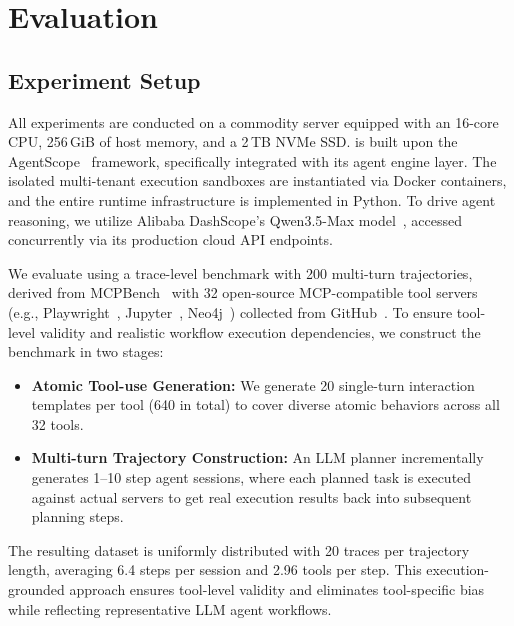 \vspace{-0.2em}
\section{Evaluation}
\label{evaluation}


\subsection{Experiment Setup}
\label{sec:exp:setup}
All experiments are conducted on a commodity server equipped with an 16-core CPU, 256\,GiB of host memory, and a 2\,TB NVMe SSD. \SystemName is built upon the AgentScope~\cite{gao2024agentscope} framework, specifically integrated with its agent engine layer. The isolated multi-tenant execution sandboxes are instantiated via Docker containers, and the entire runtime infrastructure is implemented in Python. To drive agent reasoning, we utilize Alibaba DashScope's Qwen3.5-Max model~\cite{dashscope2026}, accessed concurrently via its production cloud API endpoints.

We evaluate \SystemName using a trace-level benchmark with 200 multi-turn trajectories, derived from MCPBench~\cite{wang2025mcp} with 32 open-source MCP-compatible tool servers (e.g., Playwright~\cite{playwright}, Jupyter~\cite{jupyter}, Neo4j~\cite{neo4j}) collected from GitHub~\cite{githubmcp}. To ensure tool-level validity and realistic workflow execution dependencies, we construct the benchmark in two stages: 
\begin{itemize}[leftmargin=1.2em]
    \item \textbf{Atomic Tool-use Generation:} We generate 20 single-turn interaction templates per tool (640 in total) to cover diverse atomic behaviors across all 32 tools.
    \item \textbf{Multi-turn Trajectory Construction:} An LLM planner incrementally generates 1--10 step agent sessions, where each planned task is executed against actual servers to get real execution results back into subsequent planning steps.
\end{itemize}
The resulting dataset is uniformly distributed with 20 traces per trajectory length, averaging 6.4 steps per session and 2.96 tools per step. This execution-grounded approach ensures tool-level validity and eliminates tool-specific bias while reflecting representative LLM agent workflows.

